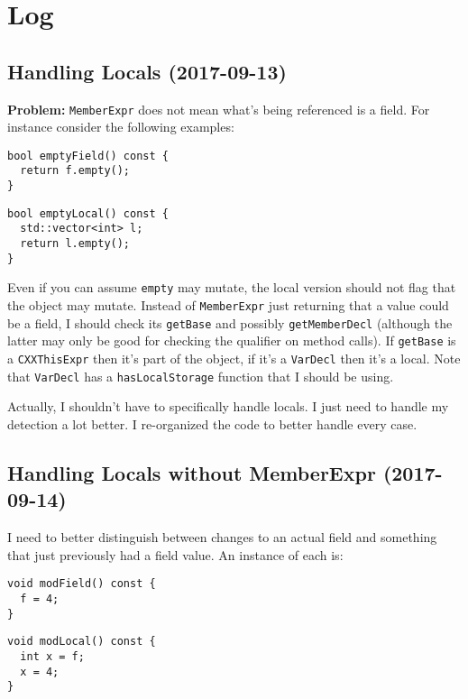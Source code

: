 \chapter{Log}

\section{Handling Locals (2017-09-13)}

\textbf{Problem:} \verb`MemberExpr` does not mean what's being referenced is a
field.
For instance consider the following examples:

\begin{verbatim}
bool emptyField() const {
  return f.empty();
}
\end{verbatim}

\begin{verbatim}
bool emptyLocal() const {
  std::vector<int> l;
  return l.empty();
}
\end{verbatim}

Even if you can assume \verb`empty` may mutate, the local version should not
flag that the object may mutate.
Instead of \verb`MemberExpr` just returning that a value could be a field, I
should check its \verb`getBase` and possibly \verb`getMemberDecl` (although the
latter may only be good for checking the \const{} qualifier on method calls).
If \verb`getBase` is a \verb`CXXThisExpr` then it's part of the object, if it's
a \verb`VarDecl` then it's a local.
Note that \verb`VarDecl` has a \verb`hasLocalStorage` function that I should be
using.

Actually, I shouldn't have to specifically handle locals.
I just need to handle my detection a lot better.
I re-organized the code to better handle every case.

\section{Handling Locals without MemberExpr (2017-09-14)}

I need to better distinguish between changes to an actual field and something
that just previously had a field value.
An instance of each is:

\begin{verbatim}
void modField() const {
  f = 4;
}
\end{verbatim}

\begin{verbatim}
void modLocal() const {
  int x = f;
  x = 4;
}
\end{verbatim}

